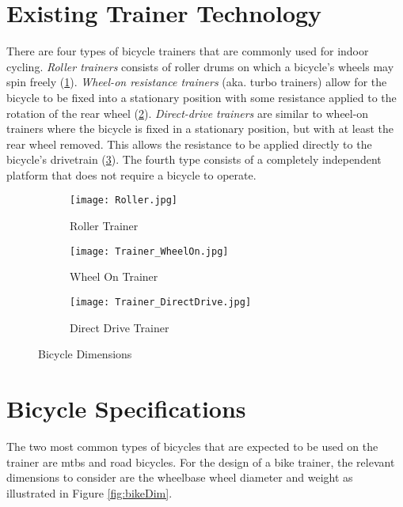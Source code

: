 \color{black}

\section{Existing Trainer Technology}
\label{sec:train}

There are four types of bicycle trainers that are commonly used for indoor cycling. \textit{Roller trainers} consists of roller drums on which a bicycle's wheels may spin freely (\ref{fig:roller}). \textit{Wheel-on resistance trainers} (aka. turbo trainers) allow for the bicycle to be fixed into a stationary position with some resistance applied to the rotation of the rear wheel (\ref{fig:wheelon}). \textit{Direct-drive trainers} are similar to wheel-on trainers where the bicycle is fixed in a stationary position, but with at least the rear wheel removed. This allows the resistance to be applied directly to the bicycle's drivetrain (\ref{fig:directdrive}). The fourth type consists of a completely independent platform that does not require a bicycle to operate. \citep{Alff:2011}

\begin{figure}[H]
	\centering
	\begin{subfigure}{.3\textwidth}
		\centering
		\texttt{[image: Roller.jpg]}
		\caption{Roller Trainer}
		\label{fig:roller}
	\end{subfigure}
	\hfill
	\begin{subfigure}{.3\textwidth}
		\centering
		\texttt{[image: Trainer\_WheelOn.jpg]}
		\caption{Wheel On Trainer}
		\label{fig:wheelon}
	\end{subfigure}
	\hfill
	\begin{subfigure}{.3\textwidth}
		\centering
		\texttt{[image: Trainer\_DirectDrive.jpg]}
		\caption{Direct Drive Trainer}
		\label{fig:directdrive}
	\end{subfigure}
	\caption{Bicycle Dimensions}
	\label{fig:trainers}
	\citep{Zwift:2022}
\end{figure}

\vspace{-1 cm}

\section{Bicycle Specifications}
The two most common types of bicycles that are expected to be used on the trainer are \acp{mtb} and road bicycles. For the design of a bike trainer, the relevant dimensions to consider are the wheelbase wheel diameter and weight as illustrated in Figure \ref{fig:bikeDim}.

